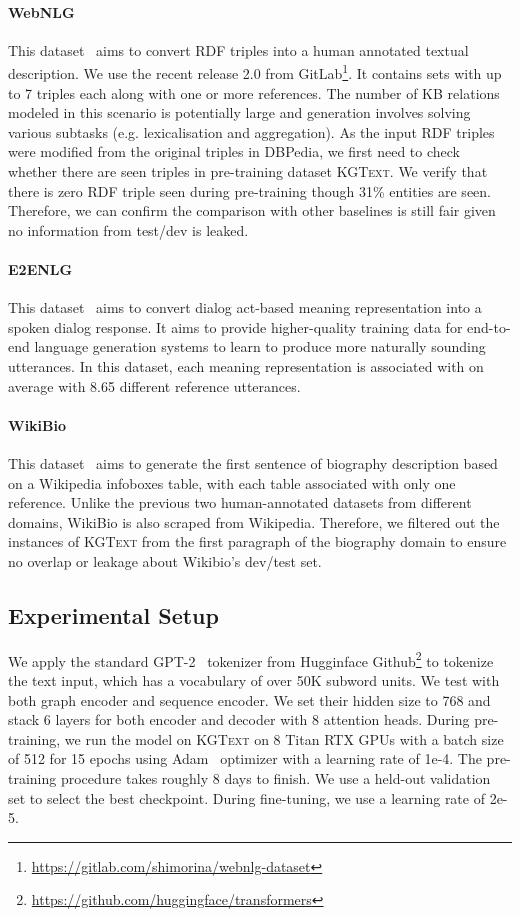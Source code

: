 \documentclass[11pt,a4paper]{article}
\newcommand{\dataset}{\textsc{KGText}\xspace}
\begin{document}
\paragraph{WebNLG}
This dataset~\cite{shimorina2018handling} aims to convert RDF triples into a human annotated textual description. We use the recent release 2.0 from GitLab\footnote{\url{https://gitlab.com/shimorina/webnlg-dataset}}. It contains sets with up to 7 triples each along with one or more references. The number of KB relations modeled in this scenario is potentially large and generation involves solving various subtasks (e.g. lexicalisation and aggregation). As the input RDF triples were modified from the original triples in DBPedia, we first need to check whether there are seen triples in pre-training dataset \dataset. We verify that there is zero RDF triple seen during pre-training though 31\% entities are seen. Therefore, we can confirm the comparison with other baselines is still fair given no information from test/dev is leaked.  
\paragraph{E2ENLG}
This dataset~\cite{dusek2019e2e} aims to convert dialog act-based meaning representation into a spoken dialog response. It aims to provide higher-quality training data for end-to-end language generation systems to learn to produce more naturally sounding utterances. In this dataset, each meaning representation is associated with on average with 8.65 different reference utterances. 
\paragraph{WikiBio}
This dataset~\cite{lebret2016neural} aims to generate the first sentence of biography description based on a Wikipedia infoboxes table, with each table associated with only one reference. Unlike the previous two human-annotated datasets from different domains, WikiBio is also scraped from Wikipedia. Therefore, we filtered out the instances of \dataset from the first paragraph of the biography domain to ensure no overlap or leakage about Wikibio's dev/test set. 

\subsection{Experimental Setup}
We apply the standard GPT-2~\cite{radford2019language} tokenizer from Hugginface Github\footnote{\url{https://github.com/huggingface/transformers}} to tokenize the text input, which has a vocabulary of over 50K subword units. We test with both graph encoder and sequence encoder. We set their hidden size to 768 and stack 6 layers for both encoder and decoder with 8 attention heads. During pre-training, we run the model on \dataset on 8 Titan RTX GPUs with a batch size of 512 for 15 epochs using Adam~\cite{kingma2014adam} optimizer with a learning rate of 1e-4. The pre-training procedure takes roughly 8 days to finish. We use a held-out validation set to select the best checkpoint. During fine-tuning, we use a learning rate of 2e-5.
\end{document}
